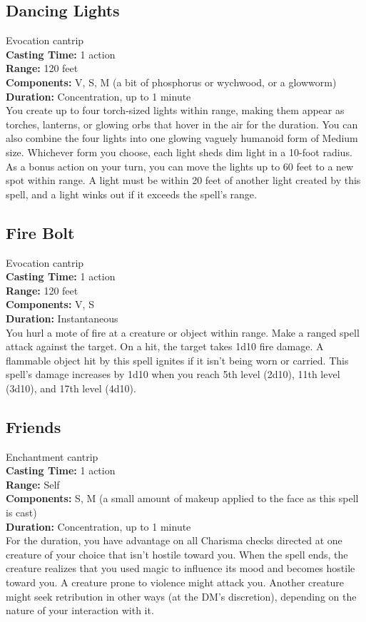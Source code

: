 \documentclass[11pt, A4paper, english]{article}
\begin{document}
		\subsection{Dancing Lights}
Evocation cantrip \\
\textbf{Casting Time:} 1 action \\
\textbf{Range:} 120 feet \\
\textbf{Components:} V, S, M (a bit of phosphorus or wychwood, or a glowworm) \\
\textbf{Duration:} Concentration, up to  1  minute \\
You create up to four torch-sized lights within range, making them appear as torches, lanterns, or glowing orbs that hover in the air for the duration. You can also combine the four lights into one glowing vaguely humanoid form of Medium size. Whichever form you choose, each light sheds dim light in a  10-foot radius. As a bonus action on your turn, you can move the lights up to 60 feet to a new spot within range. A light must be within 20 feet of another light created by this spell, and a light winks out if it exceeds the spell’s range.

		\subsection{Fire Bolt}
Evocation cantrip \\
\textbf{Casting Time:} 1 action \\
\textbf{Range:} 120 feet \\
\textbf{Components:} V, S \\
\textbf{Duration:} Instantaneous \\
You hurl a mote of fire at a creature or object within range. Make a ranged spell attack against the target. On a hit, the target takes  1d10 fire damage. A flammable object hit by this spell ignites if it isn't being worn or carried. This spell’s damage increases by 1d10 when you reach 5th level (2d10), 11th level (3d10), and 17th level (4d10).

		\subsection{Friends}
Enchantment cantrip \\
\textbf{Casting Time:} 1 action \\
\textbf{Range:} Self \\
\textbf{Components:} S, M (a small amount of makeup applied to the face as this spell is cast) \\
\textbf{Duration:} Concentration, up to  1  minute \\
For the duration, you have advantage on all Charisma checks directed at one creature of your choice that isn't hostile toward you. When the spell ends, the creature realizes that you used magic to influence its mood and becomes hostile toward you. A creature prone to violence might attack you. Another creature might seek retribution in other ways (at the DM’s discretion), depending on the nature of your interaction with it.
\end{document}
